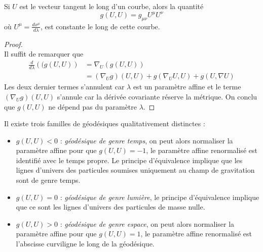 \documentclass[a4paper,11pt]{report}
\begin{document}
            \begin{prop}\begin{leftbar}
                Si $U$ est le vecteur tangent le long d'un courbe, alors la quantité
                \begin{equation}
                    g(U,U) = g_{\mu\nu}U^\mu U^\nu
                \end{equation}
                où $U^\mu = \frac{dx^\mu}{d\lambda}$, est constante le long de cette courbe.
            \end{leftbar}\end{prop}
            
            \begin{proof}${}$\\
                Il suffit de remarquer que
                \begin{align}
                    \frac{d}{d\lambda}\left((g(U,U)\right) &= \nabla_U\left(g(U,U)\right) \\
                    &= \left(\nabla_Ug\right)(U,U) + g(\nabla_U U,U) + g(U,\nabla U) 
                \end{align}
                Les deux dernier termes s'annulent car $\lambda$ est un paramètre affine et le terme $\left(\nabla_Ug\right)(U,U)$ s'annule car la dérivée covariante réserve la métrique. On conclu que $g(U,U)$ ne dépend pas du paramètre $\lambda$.
            \end{proof}
            
            \begin{defn}
                Il existe trois familles de géodésiques qualitativement distinctes :
                \begin{itemize}[label = \textbullet]
                    \item $g(U,U)<0$ : \textit{géodésique de genre temps}, on peut alors normaliser la paramètre affine pour que $g(U,U) = -1$, le paramètre affine renormalisé est identifié avec le temps propre. Le principe d'équivalence implique que les lignes d'univers des particules soumises uniquement au champ de gravitation sont de genre temps.
                    \item $g(U,U)=0$ : \textit{géodésique de genre lumière}, le principe d'équivalence implique que ce sont les lignes d'univers des particules de masse nulle.
                    \item $g(U,U)>0$ : \textit{géodésique de genre espace}, on peut alors normaliser la paramètre affine pour que $g(U,U) = 1$, le paramètre affine renormalisé est l'abscisse curviligne le long de la géodésique.
                \end{itemize}
            \end{defn}
            
\end{document}
